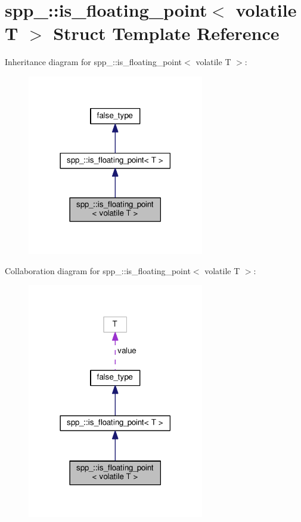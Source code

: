 \hypertarget{structspp___1_1is__floating__point_3_01volatile_01_t_01_4}{}\section{spp\+\_\+\+:\+:is\+\_\+floating\+\_\+point$<$ volatile T $>$ Struct Template Reference}
\label{structspp___1_1is__floating__point_3_01volatile_01_t_01_4}


Inheritance diagram for spp\+\_\+\+:\+:is\+\_\+floating\+\_\+point$<$ volatile T $>$\+:\nopagebreak
\begin{figure}[H]
\begin{center}
\leavevmode
\includegraphics[width=218pt]{structspp___1_1is__floating__point_3_01volatile_01_t_01_4__inherit__graph}
\end{center}
\end{figure}


Collaboration diagram for spp\+\_\+\+:\+:is\+\_\+floating\+\_\+point$<$ volatile T $>$\+:\nopagebreak
\begin{figure}[H]
\begin{center}
\leavevmode
\includegraphics[width=218pt]{structspp___1_1is__floating__point_3_01volatile_01_t_01_4__coll__graph}
\end{center}
\end{figure}
